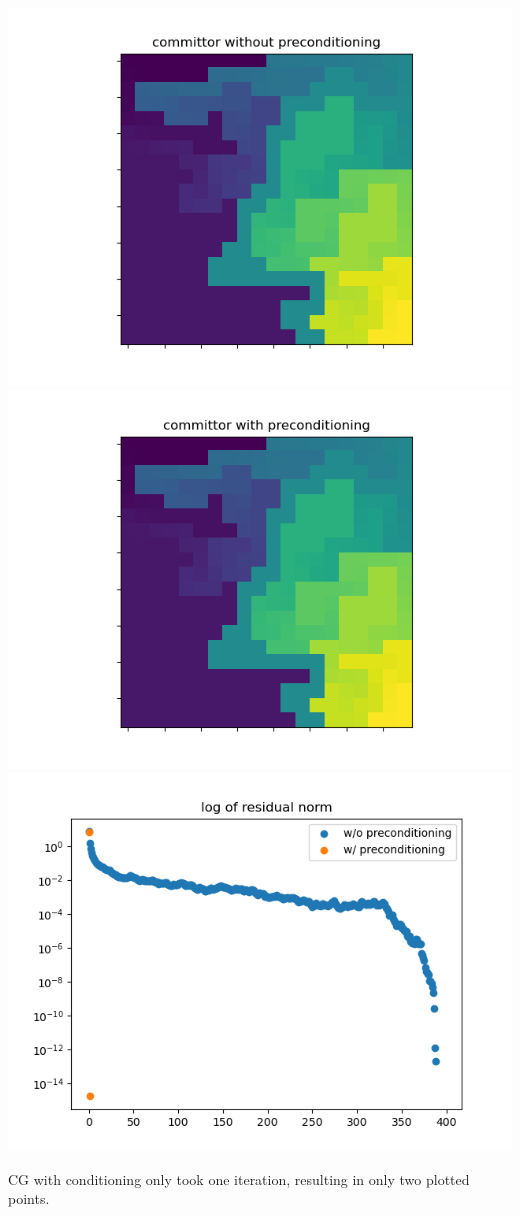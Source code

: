 \documentclass{article}
\begin{document}
\begin{enumerate}
	\begin{center}
		\includegraphics[scale=.4]{committor without preconditioning}
		\includegraphics[scale=.4]{committor with preconditioning}
		\includegraphics[scale=.5]{residual norm}
	\end{center}
	CG with conditioning only took one iteration, resulting in only two plotted points.
	
	
	
\end{enumerate}
	
	
	
	
\end{document}
